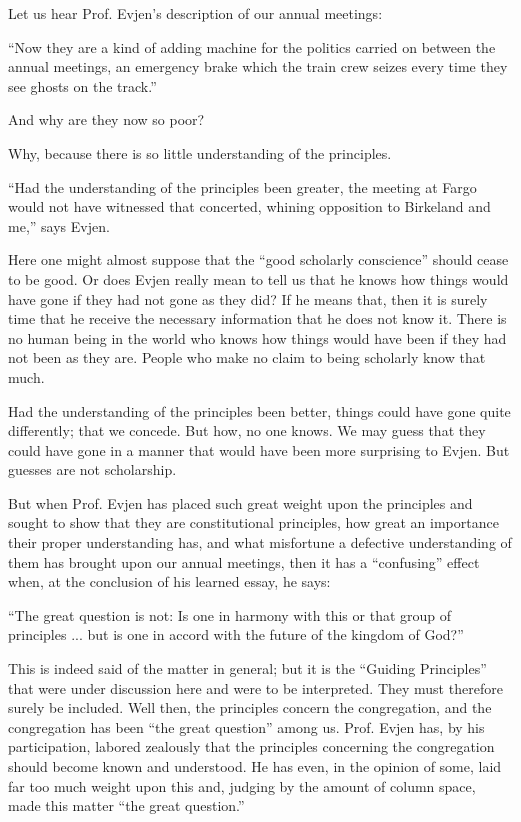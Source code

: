 Let us hear Prof. Evjen’s description of our annual meetings:

“Now they are a kind of adding machine for the politics carried on between the annual meetings, an emergency brake which the train crew seizes every time they see ghosts on the track.”

And why are they now so poor?

Why, because there is so little understanding of the principles.

“Had the understanding of the principles been greater, the meeting at Fargo would not have witnessed that concerted, whining opposition to Birkeland and me,” says Evjen.

Here one might almost suppose that the “good scholarly conscience” should cease to be good. Or does Evjen really mean to tell us that he knows how things would have gone if they had not gone as they did? If he means that, then it is surely time that he receive the necessary information that he does not know it. There is no human being in the world who knows how things would have been if they had not been as they are. People who make no claim to being scholarly know that much.

Had the understanding of the principles been better, things could have gone quite differently; that we concede. But how, no one knows. We may guess that they could have gone in a manner that would have been more surprising to Evjen. But guesses are not scholarship.

But when Prof. Evjen has placed such great weight upon the principles and sought to show that they are constitutional principles, how great an importance their proper understanding has, and what misfortune a defective understanding of them has brought upon our annual meetings, then it has a “confusing” effect when, at the conclusion of his learned essay, he says:

“The great question is not: Is one in harmony with this or that group of principles ... but is one in accord with the future of the kingdom of God?”

This is indeed said of the matter in general; but it is the “Guiding Principles” that were under discussion here and were to be interpreted. They must therefore surely be included. Well then, the principles concern the congregation, and the congregation has been “the great question” among us. Prof. Evjen has, by his participation, labored zealously that the principles concerning the congregation should become known and understood. He has even, in the opinion of some, laid far too much weight upon this and, judging by the amount of column space, made this matter “the great question.”

